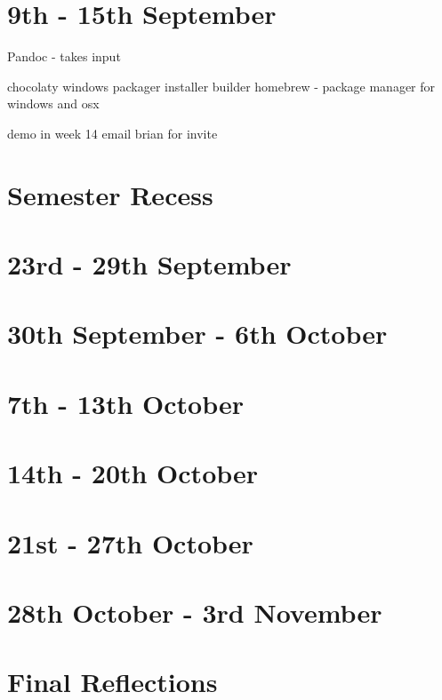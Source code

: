\documentclass{article}
\begin{document}
\section{9th - 15th September}


Pandoc - takes input 

chocolaty windows packager installer builder
homebrew - package manager for windows and osx

demo in week 14 email brian for invite


\section*{Semester Recess}

\section{23rd - 29th September}

\section{30th September - 6th October}

\section{7th - 13th October}

\section{14th - 20th October}

\section{21st - 27th October}

\section{28th October - 3rd November}

\section*{Final Reflections}
\end{document}
